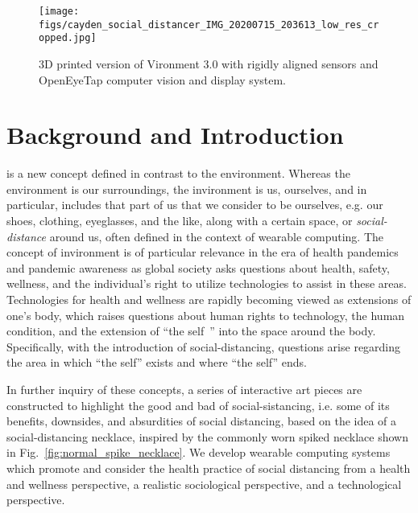 \documentclass[journal]{journal}
\begin{document}
% 
% 
% 
% 

\begin{figure}
\texttt{[image: figs/cayden\_social\_distancer\_IMG\_20200715\_203613\_low\_res\_cropped.jpg]}
\caption{3D printed version of Vironment 3.0 with rigidly aligned sensors and OpenEyeTap computer vision and display system.
}
\label{fig:vironmen3}
\end{figure}


\section{Background and Introduction}
is a new concept defined in contrast to the environment.  Whereas the environment is our surroundings, the invironment is us, ourselves, and in particular, includes that part of us that we consider to be ourselves, e.g. our shoes, clothing, eyeglasses, and the like, along with a certain space, or {\em social-distance} around us, often defined in the context of wearable computing\cite{wearableai, mannieeecomputer}.  The concept of invironment is of particular relevance in the era of health pandemics and pandemic awareness as global society asks questions about health, safety, wellness, and the individual's right to utilize technologies to assist in these areas\cite{nayak2020changing, amft2020wearables, nestor2021dear, linares2021physician}. Technologies for health and wellness are rapidly becoming viewed as extensions of one's body, which raises questions about human rights to technology, the human condition, and the extension of ``the self~\cite{fitzgerald1963self}'' into the space around the body. Specifically, with the introduction of social-distancing, questions arise regarding the area in which ``the self'' exists and where ``the self'' ends.

In further inquiry of these concepts, a series of interactive art pieces are constructed to highlight the good and bad of social-sistancing, i.e. some of its benefits, downsides, and absurdities of social distancing, based on the idea of a social-distancing necklace, inspired by the commonly worn spiked necklace shown in Fig.~\ref{fig:normal_spike_necklace}. We develop wearable computing systems which promote and consider the health practice of social distancing from a health and wellness perspective, a realistic sociological perspective, and a technological perspective.
\end{document}
